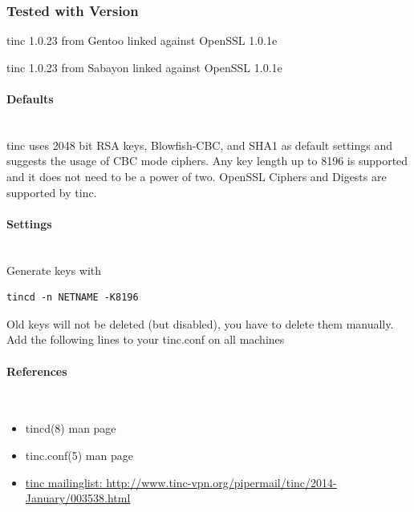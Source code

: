 \subsubsection{Tested with Version}
\begin{itemize*}
  \item tinc 1.0.23 from Gentoo linked against OpenSSL 1.0.1e
  \item tinc 1.0.23 from Sabayon linked against OpenSSL 1.0.1e
\end{itemize*}

\paragraph*{Defaults}\mbox{}\\
tinc uses 2048 bit RSA keys, Blowfish-CBC, and SHA1 as default settings and suggests the usage of CBC mode ciphers.
Any key length up to 8196 is supported and it does not need to be a power of two. OpenSSL Ciphers and Digests are supported by tinc.

\paragraph*{Settings}\mbox{}\\
Generate keys with
\begin{lstlisting}[breaklines]
tincd -n NETNAME -K8196
\end{lstlisting}
Old keys will not be deleted (but disabled), you have to delete them manually. Add the following lines to your tinc.conf on all machines

\paragraph*{References}\mbox{}\\
\begin{itemize}
\item tincd(8) man page
\item tinc.conf(5) man page
\item \href{http://www.tinc-vpn.org/pipermail/tinc/2014-January/003538.html}{tinc mailinglist: http://www.tinc-vpn.org/pipermail/tinc/2014-January/003538.html}
\end{itemize}












